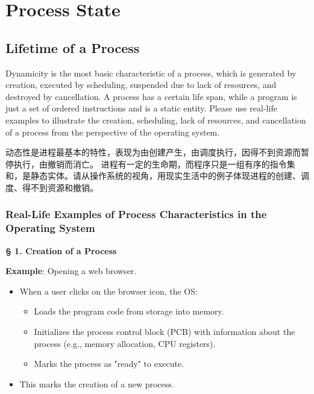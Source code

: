 \documentclass[a4paper]{book}
\newcommand{\sfbf}[1]{{\normalsize\textsf{\textbf{§ #1}}}}
\begin{document}
\section{Process State}

\subsection{Lifetime of a Process}

\begin{greenbox}
Dynamicity is the most basic characteristic of a process, which is generated by creation, executed by scheduling, suspended due to lack of resources, and destroyed by cancellation. A process has a certain life span, while a program is just a set of ordered instructions and is a static entity. Please use real-life examples to illustrate the creation, scheduling, lack of resources, and cancellation of a process from the perspective of the operating system.
\end{greenbox}

动态性是进程最基本的特性，表现为由创建产生，由调度执行，因得不到资源而暂停执行，由撤销而消亡。 进程有一定的生命期，而程序只是一组有序的指令集和，是静态实体。请从操作系统的视角，用现实生活中的例子体现进程的创建、调度、得不到资源和撤销。

\subsubsection{Real-Life Examples of Process Characteristics in the Operating System}

\sfbf{1. Creation of a Process}

\textbf{Example}: Opening a web browser.
\begin{itemize}
\item 
When a user clicks on the browser icon, the OS:
\begin{itemize}
\item 
Loads the program code from storage into memory.

\item 
Initializes the process control block (PCB) with information about the process (e.g., memory allocation, CPU registers).

\item 
Marks the process as "ready" to execute.

\end{itemize}

\item 
This marks the creation of a new process.

\end{itemize}
\end{document}
